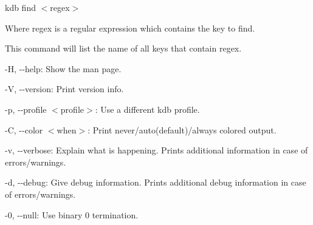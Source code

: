 {\ttfamily kdb find $<$regex$>$}

Where {\ttfamily regex} is a regular expression which contains the key to find.

This command will list the name of all keys that contain {\ttfamily regex}.


\begin{DoxyItemize}
\item {\ttfamily -\/H}, {\ttfamily -\/-\/help}\+: Show the man page.
\item {\ttfamily -\/V}, {\ttfamily -\/-\/version}\+: Print version info.
\item {\ttfamily -\/p}, {\ttfamily -\/-\/profile $<$profile$>$}\+: Use a different kdb profile.
\item {\ttfamily -\/C}, {\ttfamily -\/-\/color $<$when$>$}\+: Print never/auto(default)/always colored output.
\item {\ttfamily -\/v}, {\ttfamily -\/-\/verbose}\+: Explain what is happening. Prints additional information in case of errors/warnings.
\item {\ttfamily -\/d}, {\ttfamily -\/-\/debug}\+: Give debug information. Prints additional debug information in case of errors/warnings.
\item {\ttfamily -\/0}, {\ttfamily -\/-\/null}\+: Use binary 0 termination.
\end{DoxyItemize}

